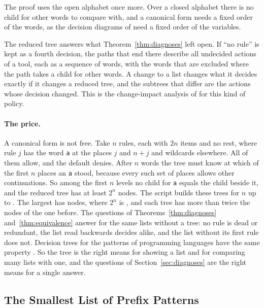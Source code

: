 \documentclass[acmsmall,nonacm,screen]{acmart}
\newcommand{\claim}[2]{#2}
\begin{document}
The proof uses the open alphabet once more. Over a closed alphabet there is no child for
other words to compare with, and a canonical form needs a fixed order of the words, as the
decision diagrams of \citet{Bryant1986} need a fixed order of the variables.

The reduced tree answers what Theorem~\ref{thm:diagnoses} left open. If ``no rule'' is kept
as a fourth decision, the paths that end there describe all undecided actions of a tool, each
as a sequence of words, with the words that are excluded where the path takes a child for
other words. A change to a list changes what it decides exactly if it changes a reduced tree,
and the subtrees that differ are the actions whose decision changed. This is the
change-impact analysis of \citet{Fisler2005} for this kind of policy.

\paragraph{The price.} A canonical form is not free. Take $n$ rules, each with $2n$ items
and no rest, where rule $j$ has the word \texttt{a} at the places $j$ and $n + j$ and
wildcards elsewhere. All of them allow, and the default denies. After $n$ words the tree must
know at which of the first $n$ places an \texttt{a} stood, because every such set of places
allows other continuations. So among the first $n$ levels no child for \texttt{a} equals the
child beside it, and the reduced tree has at least $2^n$ nodes. \claim{blowup}{The script
builds these trees for $n$ up to \exBlowupLargest{}. The largest has \exBlowupNodes{} nodes,
where $2^n$ is \exBlowupPower{}, and each tree has more than twice the nodes of the one
before. The questions of Theorems~\ref{thm:diagnoses} and~\ref{thm:equivalence} answer for
the same lists without a tree: no rule is dead or redundant, the list read backwards decides
alike, and the list without its first rule does not.} Decision trees for the patterns of
programming languages have the same property \citep{Sekar1995}. So the tree is the right
means for showing a list and for comparing many lists with one, and the questions of
Section~\ref{sec:diagnoses} are the right means for a single answer.

\subsection{The Smallest List of Prefix Patterns}
\end{document}
